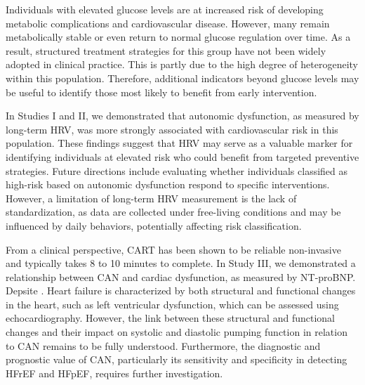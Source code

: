 \documentclass[
  a4paper,
  headsepline=true,
  open=any]{scrbook}
\begin{document}
Individuals with elevated glucose levels are at increased risk of
developing metabolic complications and cardiovascular disease. However,
many remain metabolically stable or even return to normal glucose
regulation over time. As a result, structured treatment strategies for
this group have not been widely adopted in clinical practice. This is
partly due to the high degree of heterogeneity within this population.
Therefore, additional indicators beyond glucose levels may be useful to
identify those most likely to benefit from early intervention.

In Studies I and II, we demonstrated that autonomic dysfunction, as
measured by long-term HRV, was more strongly associated with
cardiovascular risk in this population. These findings suggest that HRV
may serve as a valuable marker for identifying individuals at elevated
risk who could benefit from targeted preventive strategies. Future
directions include evaluating whether individuals classified as
high-risk based on autonomic dysfunction respond to specific
interventions. However, a limitation of long-term HRV measurement is the
lack of standardization, as data are collected under free-living
conditions and may be influenced by daily behaviors, potentially
affecting risk classification.

From a clinical perspective, CART has been shown to be reliable
non-invasive and typically takes 8 to 10 minutes to complete. In Study
III, we demonstrated a relationship between CAN and cardiac dysfunction,
as measured by NT-proBNP. Depsite . Heart failure is characterized by
both structural and functional changes in the heart, such as left
ventricular dysfunction, which can be assessed using echocardiography.
However, the link between these structural and functional changes and
their impact on systolic and diastolic pumping function in relation to
CAN remains to be fully understood. Furthermore, the diagnostic and
prognostic value of CAN, particularly its sensitivity and specificity in
detecting HFrEF and HFpEF, requires further investigation.
\end{document}
